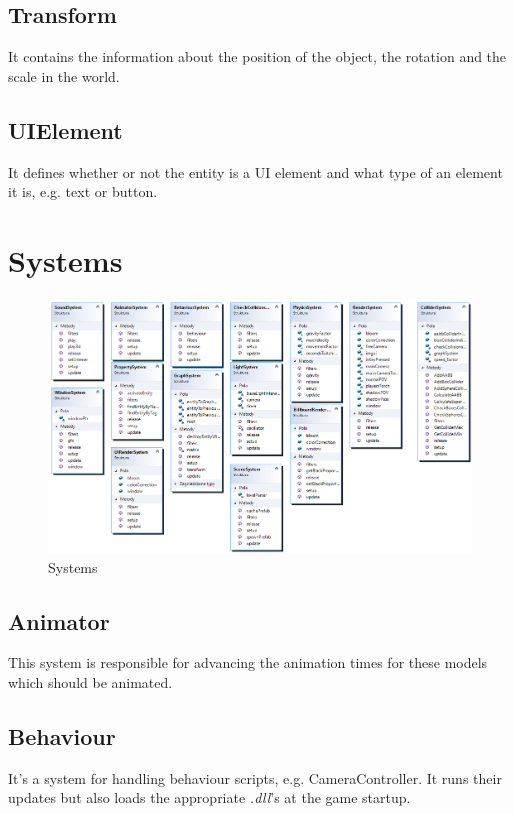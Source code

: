 \documentclass[12pt, english]{article}
\begin{document}
\subsection{Transform}
It contains the information about the position of the object, the rotation and
the scale in the world.

\subsection{UIElement}
It defines whether or not the entity is a UI element and what type of an
element it is, e.g. text or button.

\section{Systems}

\begin{figure}
	\centering
	\includegraphics[width=\textwidth]{image6.png}
	\caption{Systems}
	\label{figure_systems}
\end{figure}

\subsection{Animator}

This system is responsible for advancing the animation times for these models
which should be animated.

\subsection{Behaviour}

It's a system for handling behaviour scripts, e.g. CameraController. It runs
their updates but also loads the appropriate \textit{.dll}’s at the game
startup.
\end{document}
